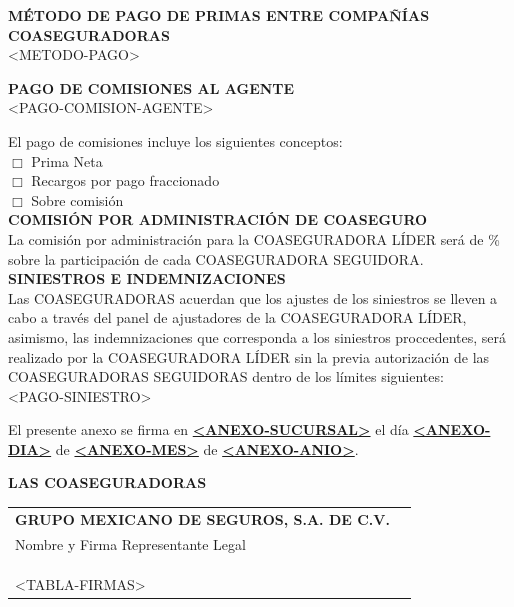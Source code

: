 ﻿\documentclass[letterpaper,10pt]{article}
\begin{document}
\newpage

\textbf{MÉTODO DE PAGO DE PRIMAS ENTRE COMPAÑÍAS COASEGURADORAS}\\

<METODO-PAGO>

\textbf{PAGO DE COMISIONES AL AGENTE}\\

<PAGO-COMISION-AGENTE>

El pago de comisiones incluye los siguientes conceptos:\\

$\Box$ Prima Neta\\
\indent $\Box$ Recargos por pago fraccionado\\
\indent $\Box$ Sobre comisión\\

\textbf{COMISIÓN POR ADMINISTRACIÓN DE COASEGURO}\\

La comisión por administración para la COASEGURADORA LÍDER será de \underline{\hspace{2cm}}\% sobre la participación de cada COASEGURADORA SEGUIDORA.\\

\textbf{SINIESTROS E INDEMNIZACIONES}\\

Las COASEGURADORAS acuerdan que los ajustes de los siniestros se lleven a cabo a través del panel de ajustadores de la COASEGURADORA LÍDER, asimismo, las indemnizaciones que corresponda a los siniestros proccedentes, será realizado por la COASEGURADORA LÍDER sin la previa autorización de las COASEGURADORAS SEGUIDORAS dentro de los límites siguientes:\\

<PAGO-SINIESTRO>

\newpage

El presente anexo se firma en \underline{\textbf{<ANEXO-SUCURSAL>}} el día \underline{\textbf{<ANEXO-DIA>}} de \underline{\textbf{<ANEXO-MES>}} de \underline{\textbf{<ANEXO-ANIO>}}.\\

\begin{center}
    \textbf{LAS COASEGURADORAS}\\\vspace{1cm}
    
    \begin{tabularx}{\textwidth}{Xr}
        \textbf{GRUPO MEXICANO DE SEGUROS, S.A. DE C.V.} &\\
        Nombre y Firma Representante Legal & \underline{\hspace{5cm}}\\\\\\\\
        <TABLA-FIRMAS>
    \end{tabularx}
\end{center}
	
\end{document}
